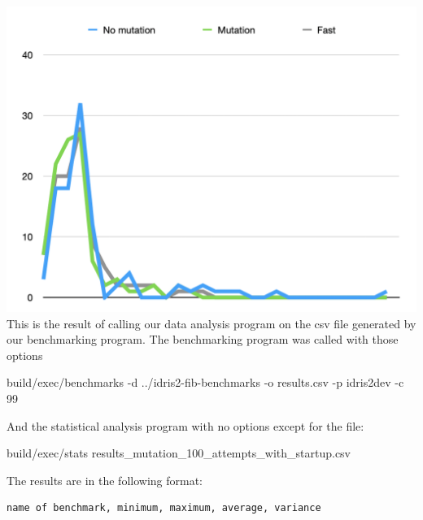 \documentclass[
]{article}
\newenvironment{Shaded}{}{}
\newcommand{\DecValTok}[1]{\textcolor[rgb]{0.25,0.63,0.44}{#1}}
\newcommand{\NormalTok}[1]{#1}
\newcommand{\OperatorTok}[1]{\textcolor[rgb]{0.40,0.40,0.40}{#1}}
\begin{document}
\includegraphics{Screenshot 2020-08-25 at 17.59.43.png} This is the
result of calling our data analysis program on the csv file generated by
our benchmarking program. The benchmarking program was called with those
options

\begin{Shaded}
\begin{Highlighting}[]
\NormalTok{build}\OperatorTok{/}\NormalTok{exec}\OperatorTok{/}\NormalTok{benchmarks }\OperatorTok{{-}}\NormalTok{d }\OperatorTok{../}\NormalTok{idris2}\OperatorTok{{-}}\NormalTok{fib}\OperatorTok{{-}}\NormalTok{benchmarks }
                      \OperatorTok{{-}}\NormalTok{o results}\OperatorTok{.}\NormalTok{csv }\OperatorTok{{-}}\NormalTok{p idris2dev }
                      \OperatorTok{{-}}\NormalTok{c }\DecValTok{99}
\end{Highlighting}
\end{Shaded}

And the statistical analysis program with no options except for the
file:

\begin{Shaded}
\begin{Highlighting}[]
\NormalTok{build}\OperatorTok{/}\NormalTok{exec}\OperatorTok{/}\NormalTok{stats results\_mutation\_100\_attempts\_with\_startup}\OperatorTok{.}\NormalTok{csv}
\end{Highlighting}
\end{Shaded}

The results are in the following format:

\begin{verbatim}
name of benchmark, minimum, maximum, average, variance
\end{verbatim}
\end{document}
